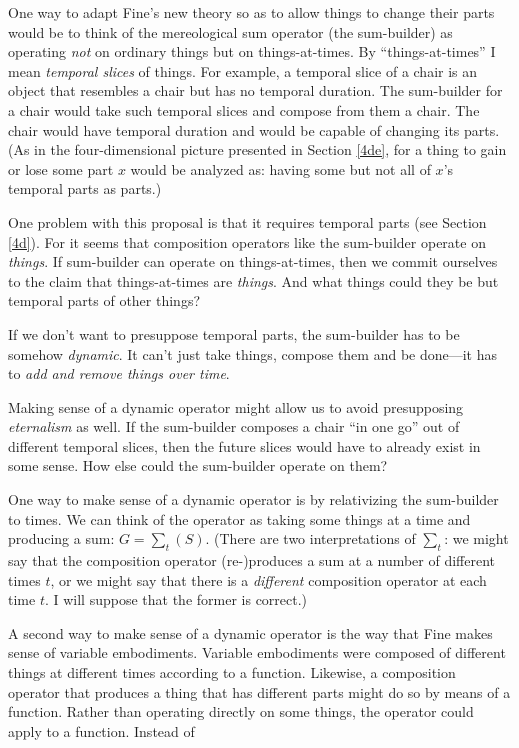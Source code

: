 \documentclass[12pt,twoside]{reedfancy}
\begin{document}
\begin{spacing}{1.25}
One way to adapt Fine's new theory so as to allow things to change
their parts would be to think of the mereological sum operator (the
sum-builder) as operating {\em not} on ordinary things but on
things-at-times.  By ``things-at-times'' I mean {\em temporal slices}
of things.  For example, a temporal slice of a chair is an object that
resembles a chair but has no temporal duration.  The sum-builder for a
chair would take such temporal slices and compose from them a chair.
The chair would have temporal duration and would be capable of
changing its parts.  (As in the four-dimensional picture presented in
Section \ref{4de}, for a thing to gain or lose some part $x$ would be
analyzed as: having some but not all of $x$'s temporal parts as
parts.)

One problem with this proposal is that it requires temporal parts (see
Section \ref{4d}).  For it seems that composition operators like the
sum-builder operate on {\em things}.  If sum-builder can operate on
things-at-times, then we commit ourselves to the claim that
things-at-times are {\em things}.  And what things could they be but
temporal parts of other things?

If we don't want to presuppose temporal parts, the sum-builder has to
be somehow \emph{dynamic}. It can't just take things, compose them and
be done---it has to \emph{add and remove things over time}.

Making sense of a dynamic operator might allow us to avoid
presupposing {\em eternalism} as well.  If the sum-builder composes a
chair ``in one go'' out of different temporal slices, then the future
slices would have to already exist in some sense.  How else could the
sum-builder operate on them?

One way to make sense of a dynamic operator is by relativizing the
sum-builder to times.  We can think of the operator as taking some
things at a time and producing a sum: $G = \sum _{t} (S)$.  (There are
two interpretations of $\sum _{t}$: we might say that the composition
operator (re-)produces a sum at a number of different times $t$, or we
might say that there is a {\em different} composition operator at each
time $t$.  I will suppose that the former is correct.)

A second way to make sense of a dynamic operator is the way that Fine
makes sense of variable embodiments.  Variable embodiments were
composed of different things at different times according to a
function.  Likewise, a composition operator that produces a thing that
has different parts might do so by means of a function.  Rather than
operating directly on some things, the operator could apply to a
function.  Instead of


\end{spacing}
\end{document}
